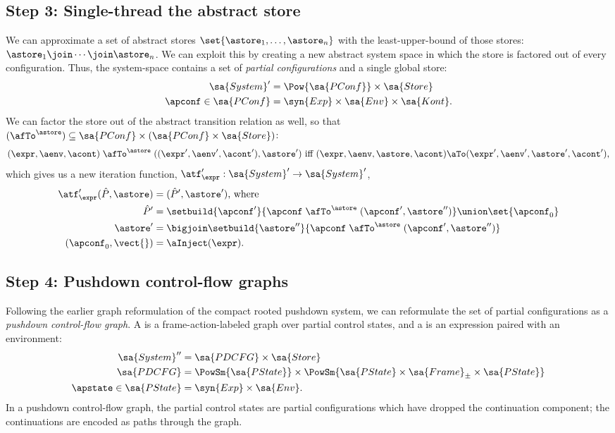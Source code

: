 \subsection{Step 3: Single-thread the abstract store}
We can approximate a set of abstract stores
$\set{\astore_1,\ldots,\astore_n}$ with 
the least-upper-bound of those stores: $\astore_1 \join \cdots
\join \astore_n$.
We can exploit this by creating a new abstract system space in which
the store is factored out of every configuration.
Thus, the system-space contains a set of \emph{partial configurations}
and a single global store:
\begin{align*}
  \sa{System}' &= \Pow{\sa{PConf}} \times \sa{Store}
  \\
  \apconf \in \sa{PConf} &= \syn{Exp} \times \sa{Env} \times \sa{Kont}
  \text.
\end{align*}
We can factor the store out of the abstract transition relation as well, so that
$(\afTo^\astore) \subseteq \sa{PConf} \times (\sa{PConf} \times \sa{Store})$:
\begin{align*}
  (\expr, \aenv, \acont) \mathrel{\afTo^{\astore}} ((\expr',\aenv',\acont'), \astore') 
  \text{ iff }
(\expr, \aenv, \astore, \acont) \aTo (\expr',\aenv', \astore', \acont') 
\text,
\end{align*}
which gives us a new iteration function,
$\atf'_\expr : \sa{System}' \to \sa{System}'$,
\begin{align*}
  \atf'_\expr(\hat P,\astore) &= (\hat P',\astore')\text{, where } 
  \\
  \hat P' &= \setbuild{ \apconf' }{ \apconf \mathrel{\afTo^\astore} (\apconf',\astore'') } \union \set{ \apconf_0 } 
  \\
  \astore' &= \bigjoin \setbuild{ \astore'' }{ \apconf \mathrel{\afTo^\astore} (\apconf',\astore'') }
  \\
  (\apconf_0,\vect{}) &= \aInject(\expr)
  \text.
\end{align*}

\subsection{Step 4: Pushdown control-flow graphs}
Following the earlier graph reformulation of the compact rooted
pushdown system, we can reformulate the set of partial
configurations as a \emph{pushdown control-flow graph}.
A  is a frame-action-labeled
graph over partial control states, and a  is an expression paired with an environment:
\begin{align*}
  \sa{System}'' &= \sa{PDCFG} \times \sa{Store}
  \\
  \sa{PDCFG} &= \PowSm{\sa{PState}} \times \PowSm{\sa{PState} \times \sa{Frame}_\pm \times \sa{PState}}
  \\
  \apstate \in \sa{PState} &= \syn{Exp} \times \sa{Env}
  \text.
\end{align*}
In a pushdown control-flow graph, the partial control states are
partial configurations which have dropped the continuation component;
the continuations are encoded as paths through the graph.

